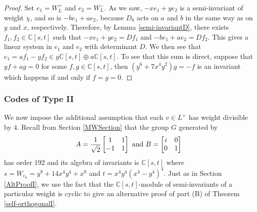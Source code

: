 \documentclass[a4paper,reqno]{amsart}
\theoremstyle{definition}
\theoremstyle{remark} \newtheorem{remark}[theorem]{Remark}
\numberwithin{equation}{section}
\begin{document}
\begin{proof}
    Set \(e_1 = W_L^+\) and \(e_2 = W_L^-\). As we saw, \(-xe_1 + ye_2\) is a semi-invariant of weight \(\chi\), and so is \(-be_1 + ae_2\), because \(D_8\) acts on \(a\) and \(b\) in the same way as on \(y\) and \(x\),  respectively. Therefore, by Lemma \ref{semi-invariantD}, there exists \(f_1, f_2 \in \mathbb{C}[s,t]\) such that \(-xe_1 + ye_2 = Df_1\) and \(-be_1 + ae_2 = Df_2\). This gives a linear system in \(e_1\) and \(e_2\) with determinant \(D\). We then see that \(e_1 = af_1 - yf_2 \in y\mathbb{C}[s,t] \oplus a\mathbb{C}[s,t]\). To see that this sum is direct, suppose that \(yf + ag = 0\) for some \(f,g \in \mathbb{C}[s,t]\), then \((y^6 + 7x^4y^2)g = -f\) is an invariant which happens if and only if \(f = g = 0\).
\end{proof}

\subsubsection{Codes of Type II} We now impose the additional assumption that each \(v \in L^+\) has weight divisible by \(4\). Recall from Section \ref{MWSection} that the group \(G\) generated by
\begin{equation*}
    A = \frac{1}{\sqrt{2}}
    \begin{bmatrix}
        1 & 1 \\
        -1 & 1
    \end{bmatrix}
    \textnormal{ and }
    B = 
    \begin{bmatrix}
        i & 0 \\
        0 & 1
    \end{bmatrix}
\end{equation*}
has order \(192\) and its algebra of invariants is \(\mathbb{C}[s,t]\) where \(s = W_{e_8} = y^8 + 14x^4y^4 + x^8\) and \(t = x^4y^4(x^4-y^4)^4\). Just as in Section \ref{AltProofI}, we use the fact that the \(\mathbb{C}[s,t]\)-module of semi-invariants of a particular weight is cyclic to give an alternative proof of part (B) of Theorem \ref{self-orthogonalI}.
\end{document}
